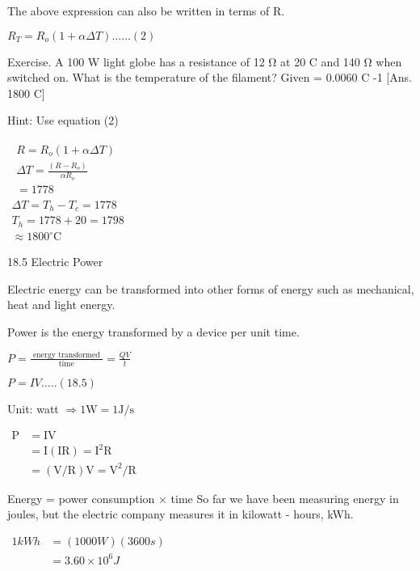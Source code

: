 \documentclass{extarticle}
\begin{document}
The above expression can also be written in terms of R.

$R_{T}=R_{o}(1+\alpha \Delta T) \ldots \ldots(2)$



Exercise. A 100 W light globe has a resistance of 12 Ω at 20
C and 140 Ω when switched on. What is the temperature of
the filament? Given  = 0.0060 C -1 [Ans. 1800 C]

Hint: Use equation (2)


$\begin{array}{l}\begin{aligned} R =R_{o}(1+\alpha \Delta T) \\
\Delta T =\frac{\left(R-R_{o}\right)}{\alpha R_{o}} \\
=1778 \end{aligned} \\
\Delta T=T_{h}-T_{c}=1778 \\
T_{h} =1778+20=1798 \\
\approx 1800^{\circ} \mathrm{C}\end{array}$



18.5 Electric Power

Electric energy can be transformed into other forms
of energy such as mechanical, heat and light energy.

Power is the energy transformed by a device per
unit time.

$P=\frac{\text { energy transformed }}{\text { time }}=\frac{Q V}{t}$

$P=I V \ldots . .(18.5)$

Unit: watt $\Rightarrow 1 \mathrm{W}=1 \mathrm{J} / \mathrm{s}$

$\begin{aligned} \mathrm{P} &=\mathrm{I} \mathrm{V} \\ &=\mathrm{I}(\mathrm{I} \mathrm{R})=\mathrm{I}^{2} \mathrm{R} \\ &=(\mathrm{V} / \mathrm{R}) \mathrm{V}=\mathrm{V}^{2} / \mathrm{R} \end{aligned}$

Energy = power consumption × time
So far we have been measuring energy in joules, but
the electric company measures it in kilowatt - hours,
kWh.

$\begin{aligned} 1 k W h &=(1000 W)(3600 s) \\ &=3.60 \times 10^{6} J \end{aligned}$
\end{document}

